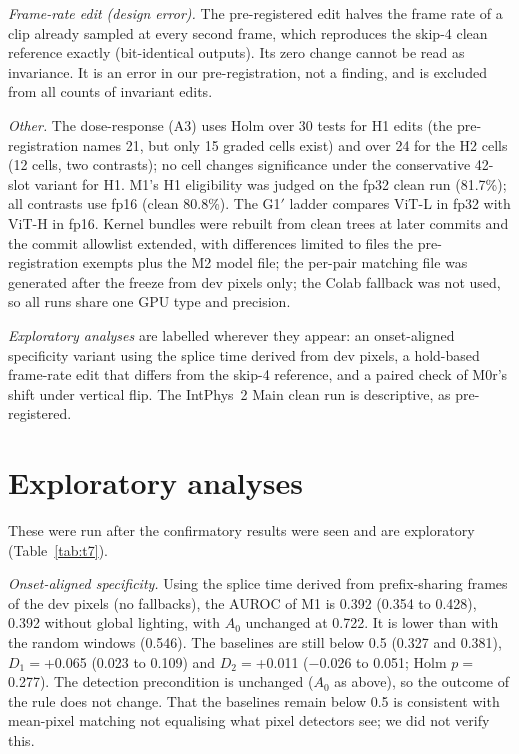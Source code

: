 \emph{Frame-rate edit (design error).} The pre-registered edit halves the frame rate of a clip already sampled at every second frame, which reproduces the skip-4 clean reference exactly (bit-identical outputs). Its zero change cannot be read as invariance. It is an error in our pre-registration, not a finding, and is excluded from all counts of invariant edits.

\emph{Other.} The dose-response (A3) uses Holm over 30 tests for H1 edits (the pre-registration names 21, but only 15 graded cells exist) and over 24 for the H2 cells (12 cells, two contrasts); no cell changes significance under the conservative 42-slot variant for H1. M1's H1 eligibility was judged on the fp32 clean run (81.7\%); all contrasts use fp16 (clean 80.8\%). The G1$'$ ladder compares ViT-L in fp32 with ViT-H in fp16. Kernel bundles were rebuilt from clean trees at later commits and the commit allowlist extended, with differences limited to files the pre-registration exempts plus the M2 model file; the per-pair matching file was generated after the freeze from dev pixels only; the Colab fallback was not used, so all runs share one GPU type and precision.

\emph{Exploratory analyses} are labelled wherever they appear: an onset-aligned specificity variant using the splice time derived from dev pixels, a hold-based frame-rate edit that differs from the skip-4 reference, and a paired check of M0r's shift under vertical flip. The IntPhys~2 Main clean run is descriptive, as pre-registered.

\section{Exploratory analyses}
\label{sec:supp-expl}
These were run after the confirmatory results were seen and are exploratory (Table~\ref{tab:t7}).

\emph{Onset-aligned specificity.} Using the splice time derived from prefix-sharing frames of the dev pixels (no fallbacks), the AUROC of M1 is 0.392 (0.354 to 0.428), 0.392 without global lighting, with $A_0$ unchanged at 0.722. It is lower than with the random windows (0.546). The baselines are still below 0.5 (0.327 and 0.381), $D_1=$+0.065 (0.023 to 0.109) and $D_2=$+0.011 ($-$0.026 to 0.051; Holm $p=$0.277). The detection precondition is unchanged ($A_0$ as above), so the outcome of the rule does not change. That the baselines remain below 0.5 is consistent with mean-pixel matching not equalising what pixel detectors see; we did not verify this.

